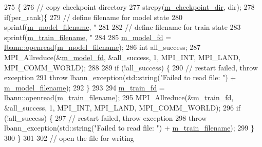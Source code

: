 \begin{DoxyCode}
275                                                               \{
276   \textcolor{comment}{// copy checkpoint directory}
277   strcpy(\hyperlink{classlbann_1_1persist_a17c2b08ec1815aba6d3eae6502397bb1}{m\_checkpoint\_dir}, dir);
278   \textcolor{keywordflow}{if}(per\_rank)\{
279     \textcolor{comment}{// define filename for model state}
280     sprintf(\hyperlink{classlbann_1_1persist_ac01cd3c8fe0f97c1312ca1a595f2f690}{m\_model\_filename}, \textcolor{stringliteral}{"%
281 
282     \textcolor{comment}{// define filename for train state}
283     sprintf(\hyperlink{classlbann_1_1persist_a417a443c894fd07472504936f5b02b62}{m\_train\_filename}, \textcolor{stringliteral}{"%
284 
285     \hyperlink{classlbann_1_1persist_a1adc7102c1b4bc91534ca156decbd965}{m\_model\_fd} = \hyperlink{namespacelbann_a6084b9319eea1997f8446fa3e6879532}{lbann::openread}(\hyperlink{classlbann_1_1persist_ac01cd3c8fe0f97c1312ca1a595f2f690}{m\_model\_filename});
286     \textcolor{keywordtype}{int} all\_success;
287     MPI\_Allreduce(&\hyperlink{classlbann_1_1persist_a1adc7102c1b4bc91534ca156decbd965}{m\_model\_fd}, &all\_success, 1, MPI\_INT, MPI\_LAND, MPI\_COMM\_WORLD);
288  
289     \textcolor{keywordflow}{if} (!all\_success) \{
290         \textcolor{comment}{// restart failed, throw exception}
291         \textcolor{keywordflow}{throw} lbann\_exception(std::string(\textcolor{stringliteral}{"Failed to read file: "}) + 
      \hyperlink{classlbann_1_1persist_ac01cd3c8fe0f97c1312ca1a595f2f690}{m\_model\_filename});
292       \}
293       
294       \hyperlink{classlbann_1_1persist_a817671390811dde04670c47139402f51}{m\_train\_fd} = \hyperlink{namespacelbann_a6084b9319eea1997f8446fa3e6879532}{lbann::openread}(\hyperlink{classlbann_1_1persist_a417a443c894fd07472504936f5b02b62}{m\_train\_filename});
295       MPI\_Allreduce(&\hyperlink{classlbann_1_1persist_a817671390811dde04670c47139402f51}{m\_train\_fd}, &all\_success, 1, MPI\_INT, MPI\_LAND, MPI\_COMM\_WORLD);
296       \textcolor{keywordflow}{if} (!all\_success) \{
297       \textcolor{comment}{// restart failed, throw exception}
298       \textcolor{keywordflow}{throw} lbann\_exception(std::string(\textcolor{stringliteral}{"Failed to read file: "}) + 
      \hyperlink{classlbann_1_1persist_a417a443c894fd07472504936f5b02b62}{m\_train\_filename});
299     \}
300   \}
301   
302   \textcolor{comment}{// open the file for writing}
}}
\end{DoxyCode}
